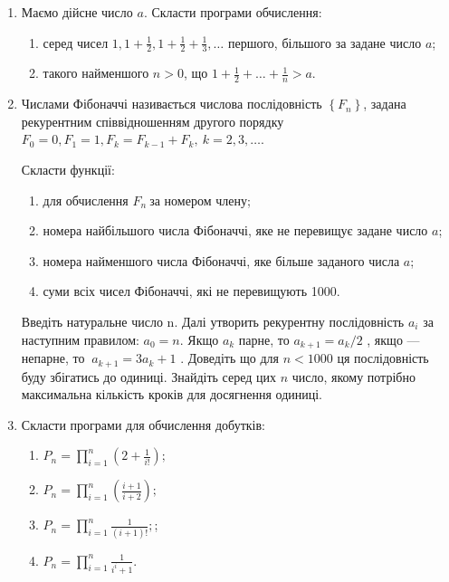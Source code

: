 \documentclass[]{article}
\makeatletter
\newcommand{\xslalph}[1]{\expandafter\@xslalph\csname c@#1\endcsname}
\newcommand{\@xslalph}[1]{%
    \ifcase#1\or а\or б\or в\or г\or д\or e\or є\or ж\or з\or i%
    \or й\or к\or л\or м\or н\or о\or п\or р\or с\or т%
    \or у\or ф\or х\or ц\or ч\or ш\or ю\or я\or аа\or бб\or вв %
    \else\@ctrerr\fi%
}
\makeatother
\begin{document}
\begin{enumerate}
\def\labelenumi{\arabic{enumi})}
\item
  Маємо дійсне число $a$. Скласти програми обчислення:
\begin{enumerate}[label=\xslalph*)]
\item серед чисел
\(1,1 + \frac{1}{2},1 + \frac{1}{2} + \frac{1}{3},\ldots\) першого,
більшого за задане число $a$;

\item такого найменшого $n>0$, що
\(1 + \frac{1}{2} + \ldots + \frac{1}{n} > a.\)

\end{enumerate}

\item
  Числами Фібоначчі називається числова послідовність
  \(\left\{ F_{n} \right\}\), задана рекурентним співвідношенням другого
  порядку
  \(F_{0} = 0,F_{1} = 1,F_{k} = F_{k - 1} + F_{k},\ k = 2,3,\ldots\).

Скласти функції:
\begin{enumerate}[label=\xslalph*)]
\item
для обчислення \(F_{n}\ \)за номером члену;
\item номера найбільшого числа Фібоначчі, яке не перевищує задане число
$a$;
\item номера найменшого числа Фібоначчі, яке більше заданого числа
$a$;
\item суми всіх чисел Фібоначчі, які не перевищують 1000.

\end{enumerate}
Введіть натуральне число n. Далі утворить рекурентну послідовність
\(a_{i}\) за наступним правилом: \(a_{0} = n\). Якщо \(a_{k}\) парне, то
\(a_{k + 1} = a_{k}/2\) , якщо --- непарне,
то \(\ a_{k + 1} = 3a_{k} + 1\) . Доведіть що для $n<1000$ ця
послідовність буду збігатись до одиниці. Знайдіть серед цих $n$ число,
якому потрібно максимальна кількість кроків для досягнення одиниці.

\item
  Скласти програми для обчислення добутків:
\begin{enumerate}[label=\xslalph*)]
\item \(P_{n} = \prod\limits_{i = 1}^{n}\left( 2 + \frac{1}{i!} \right);\) 
\item
\(P_{n} = \prod\limits_{i = 1}^{n}\left( \frac{i + 1}{i + 2} \right);\)
\item
\(P_{n} = \prod\limits_{i = 1}^{n}\frac{1}{(i + 1)!};\); 
\item
\(P_{n} = \prod\limits_{i = 1}^{n}\frac{1}{i^{i} + 1}.\)
\end{enumerate}


\end{enumerate}
\end{document}
